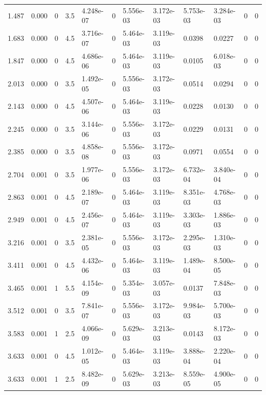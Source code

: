 \documentclass[preview]{standalone}
\begin{document}
{{\begin{tabular}{L{1.2cm}C{1.2cm} C{0.3cm}C{0.5cm} C{1.4cm}C{1.4cm} C{1.4cm}C{1.4cm} C{1.6cm}C{1.6cm} C{1.6cm}C{1.6cm}}
  1.487  &  0.000  & 0     & 3.5 &  4.248e-07  & 0  &  5.556e-03&   3.172e-03& 5.753e-03 & 3.284e-03   &  0 & 0  \\ 
  1.683  &  0.000  & 0     & 4.5 &  3.716e-07  & 0  &  5.464e-03&   3.119e-03& 0.0398 & 0.0227   &  0 & 0  \\ 
  1.847  &  0.000  & 0     & 4.5 &  4.686e-06  & 0  &  5.464e-03&   3.119e-03& 0.0105 & 6.018e-03   &  0 & 0  \\ 
  2.013  &  0.000  & 0     & 3.5 &  1.492e-05  & 0  &  5.556e-03&   3.172e-03& 0.0514 & 0.0294   &  0 & 0  \\ 
  2.143  &  0.000  & 0     & 4.5 &  4.507e-06  & 0  &  5.464e-03&   3.119e-03& 0.0228 & 0.0130   &  0 & 0  \\ 
  2.245  &  0.000  & 0     & 3.5 &  3.144e-06  & 0  &  5.556e-03&   3.172e-03& 0.0229 & 0.0131   &  0 & 0  \\ 
  2.385  &  0.000  & 0     & 3.5 &  4.858e-08  & 0  &  5.556e-03&   3.172e-03& 0.0971 & 0.0554   &  0 & 0  \\ 
  2.704  &  0.001  & 0     & 3.5 &  1.977e-06  & 0  &  5.556e-03&   3.172e-03& 6.732e-04 & 3.840e-04   &  0 & 0  \\ 
  2.863  &  0.001  & 0     & 4.5 &  2.189e-07  & 0  &  5.464e-03&   3.119e-03& 8.351e-03 & 4.768e-03   &  0 & 0  \\ 
  2.949  &  0.001  & 0     & 4.5 &  2.456e-07  & 0  &  5.464e-03&   3.119e-03& 3.303e-03 & 1.886e-03   &  0 & 0  \\ 
  3.216  &  0.001  & 0     & 3.5 &  2.381e-05  & 0  &  5.556e-03&   3.172e-03& 2.295e-03 & 1.310e-03   &  0 & 0  \\ 
  3.411  &  0.001  & 0     & 4.5 &  4.432e-06  & 0  &  5.464e-03&   3.119e-03& 1.489e-04 & 8.500e-05   &  0 & 0  \\ 
  3.465  &  0.001  & 1     & 5.5 &  4.154e-09  & 0  &  5.354e-03&   3.057e-03& 0.0137 & 7.848e-03   &  0 & 0  \\ 
  3.512  &  0.001  & 0     & 3.5 &  7.841e-07  & 0  &  5.556e-03&   3.172e-03& 9.984e-03 & 5.700e-03   &  0 & 0  \\ 
  3.583  &  0.001  & 1     & 2.5 &  4.066e-09  & 0  &  5.629e-03&   3.213e-03& 0.0143 & 8.172e-03   &  0 & 0  \\ 
  3.633  &  0.001  & 0     & 4.5 &  1.012e-05  & 0  &  5.464e-03&   3.119e-03& 3.888e-04 & 2.220e-04   &  0 & 0  \\ 
  3.633  &  0.001  & 1     & 2.5 &  8.482e-09  & 0  &  5.629e-03&   3.213e-03& 8.559e-05 & 4.900e-05   &  0 & 0  \\ 

\end{tabular}}}
\end{document}
